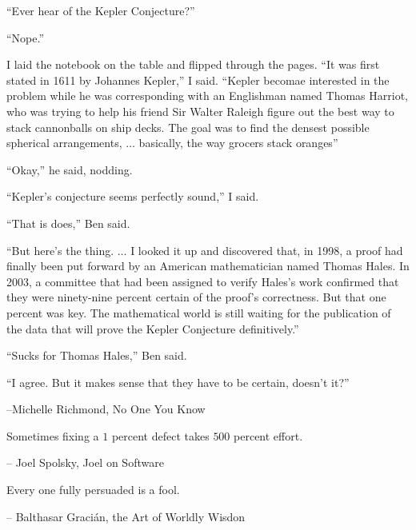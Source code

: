 {

\narrower\parindent=0pt
\baselineskip

{\it

``Ever hear of the Kepler Conjecture?''

``Nope.''

I laid the notebook on the table and flipped through the pages. ``It was first stated
in 1611 by Johannes Kepler,'' I said.  ``Kepler becomae interested in the problem while
he was corresponding with an Englishman named Thomas Harriot, who was trying
to help his friend Sir Walter Raleigh figure out the best way to stack cannonballs on ship
decks.  The goal was to find the densest possible spherical arrangements, $\ldots$ basically,
the way grocers stack oranges''

``Okay,'' he said, nodding.

``Kepler's conjecture {\rm{seems}} perfectly sound,'' I said.

``That is does,'' Ben said.

``But here's the thing. $\ldots$  I looked it up and discovered that, in 1998, a proof
had finally been put forward by an American mathematician named Thomas Hales.  In 2003,
a committee that had been assigned to verify Hales's work confirmed that they were ninety-nine
percent certain of the proof's correctness.  But that one percent was key.  The mathematical
world is still waiting for the publication of the data that will prove the Kepler Conjecture definitively.''

``Sucks for Thomas Hales,'' Ben said.

``I agree.  But it makes sense that they have to be certain, doesn't it?''


{\hfill--Michelle Richmond, No One You Know} %

}

}


\bigskip

{

\narrower\parindent=0pt
\baselineskip

{\it

Sometimes fixing a $1$ percent defect takes $500$ percent effort.

{\hfill-- Joel Spolsky, Joel on Software} %

}

}

\bigskip

{

\narrower\parindent=0pt
\baselineskip

{\it

Every one fully persuaded is a fool.

{\hfill-- Balthasar Graci\'an, the Art of Worldly Wisdon} %

}

}



